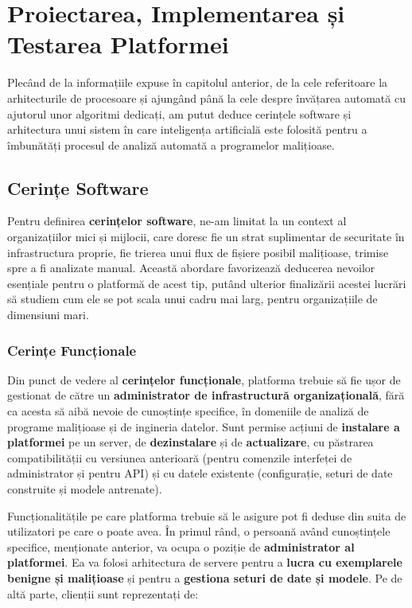 \documentclass[../../main.tex]{subfiles}
\begin{document}
\chapter{Proiectarea, Implementarea și \\Testarea Platformei}
\label{ch:platform}

Plecând de la informațiile expuse în capitolul anterior, de la cele referitoare la arhitecturile de procesoare și ajungând până la cele despre învățarea automată cu ajutorul unor algoritmi dedicați, am putut deduce cerințele software și arhitectura unui sistem în care inteligența artificială este folosită pentru a îmbunătăți procesul de analiză automată a programelor malițioase.

\section{Cerințe Software}
\label{sec:platform_requirements}

Pentru definirea \textbf{cerințelor software}, ne-am limitat la un context al organiza\-țiilor mici și mijlocii, care doresc fie un strat suplimentar de securitate în infra\-structura proprie, fie trierea unui flux de fișiere posibil malițioase, trimise spre a fi analizate manual. Această abordare favorizează deducerea nevoilor esențiale pentru o platformă de acest tip, putând ulterior finalizării acestei lucrări să studiem cum ele se pot scala unui cadru mai larg, pentru organizațiile de dimensiuni mari.

\subsection{Cerințe Funcționale}

Din punct de vedere al \textbf{cerințelor funcționale}, platforma trebuie să fie ușor de gestionat de către un \textbf{administrator de infrastructură organizațională}, fără ca acesta să aibă nevoie de cunoștințe specifice, în domeniile de analiză de programe malițioase și de ingineria datelor. Sunt permise acțiuni de \textbf{instalare a platformei} pe un server, de \textbf{dezinstalare} și de \textbf{actualizare}, cu păstrarea compatibilității cu versiunea anterioară (pentru comenzile interfeței de administrator și pentru API) și cu datele existente (configurație, seturi de date construite și modele antrenate).

Funcționalitățile pe care platforma trebuie să le asigure pot fi deduse din suita de utilizatori pe care o poate avea. În primul rând, o persoană având cunoștințele specifice, menționate anterior, va ocupa o poziție de \textbf{administrator al platformei}. Ea va folosi arhitectura de servere pentru a \textbf{lucra cu exemplarele benigne și malițioase} și pentru a \textbf{gestiona seturi de date și modele}. Pe de altă parte, clienții sunt reprezentați de:
\end{document}
